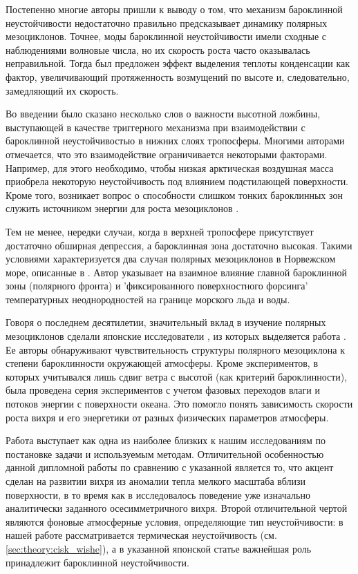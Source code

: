 Постепенно многие авторы пришли к выводу о том, что механизм бароклинной неустойчивости недостаточно правильно предсказывает динамику полярных мезоциклонов. Точнее, моды бароклинной неустойчивости имели сходные с наблюдениями волновые числа, но их скорость роста часто оказывалась неправильной. Тогда был предложен эффект выделения теплоты конденсации как фактор, увеличивающий протяженность возмущений по высоте и, следовательно, замедляющий их скорость.

Во введении было сказано несколько слов о важности высотной ложбины, выступающей в качестве триггерного механизма при взаимодействии с бароклинной неустойчивостью в нижних слоях тропосферы. Многими авторами отмечается, что это взаимодействие ограничивается некоторыми факторами. Например, для этого необходимо, чтобы низкая арктическая воздушная масса приобрела некоторую неустойчивость под влиянием подстилающей поверхности. Кроме того, возникает вопрос о способности слишком тонких бароклинных зон служить источником энергии для роста мезоциклонов \citep{AlbrightEtAl1995}.

Тем не менее, нередки случаи, когда в верхней тропосфере присутствует достаточно обширная депрессия, а бароклинная зона достаточно высокая. Такими условиями характеризуется два случая полярных мезоциклонов в Норвежском море, описанные в \citep{Nordeng1990}. Автор указывает на взаимное влияние главной бароклинной зоны (полярного фронта) и 'фиксированного поверхностного форсинга' температурных неоднородностей на границе морского льда и воды.

Говоря о последнем десятилетии, значительный вклад в изучение полярных мезоциклонов сделали японские исследователи \citep{YanaseEtAl2004,YanaseNiino2004,Nagata1993}, из которых выделяется работа \citep{YanaseNiino2007}. Ее авторы обнаруживают чувствительность структуры полярного мезоциклона к степени бароклинности окружающей атмосферы. Кроме экспериментов, в которых учитывался лишь сдвиг ветра с высотой (как критерий бароклинности), была проведена серия экспериментов с учетом фазовых переходов влаги и потоков энергии с поверхности океана. Это помогло понять зависимость скорости роста вихря и его энергетики от разных физических параметров атмосферы. 

Работа \citep{YanaseNiino2007} выступает как одна из наиболее близких к нашим исследованиям по постановке задачи и используемым методам. Отличительной особенностью данной дипломной работы по сравнению с указанной является то, что акцент сделан на развитии вихря из аномалии тепла мелкого масштаба вблизи поверхности, в то время как в \citep{YanaseNiino2007} исследовалось поведение уже изначально аналитически заданного осесимметричного вихря. Второй отличительной чертой являются фоновые атмосферные условия, определяющие тип неустойчивости: в нашей работе рассматривается термическая неустойчивость (см. \ref{sec:theory:cisk_wishe}), а в указанной японской статье важнейшая роль принадлежит бароклинной неустойчивости.

